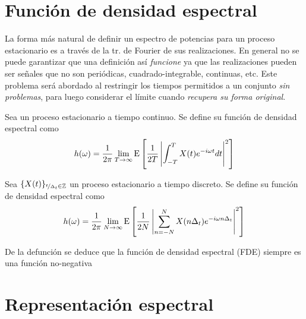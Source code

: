 
\section{Función de densidad espectral}

La forma más natural de definir un espectro de potencias para un proceso estacionario es a través 
de la tr. de Fourier de sus realizaciones. En general no se puede garantizar que una definición así \textit{funcione} ya que las realizaciones pueden ser señales que no son periódicas, 
cuadrado-integrable, continuas, etc.
%
Este problema será abordado al restringir los tiempos permitidos a un conjunto \textit{sin 
problemas}, para luego considerar el límite cuando \textit{recupera su forma original}.

\begin{definicion}
Sea \xt un proceso estacionario a tiempo continuo. Se define su {función de densidad 
espectral} como
\begin{equation}
h(\omega) = \frac{1}{2 \pi} \lim_{T\rightarrow \infty} \mathrm{E}\left[  \frac{1}{2T} 
\left|  \int_{-T}^{T} X(t) e^{-i \omega t} dt \right|^{2}  \right]
\label{txt_FDE_cont}
\end{equation}
\end{definicion}

\begin{definicion}
Sea $\{X(t)\}_{\nicefrac{t}{\Delta_t}\in \mathbb{Z}}$ un proceso estacionario a tiempo discreto. Se 
define su {función de densidad espectral} como
\begin{equation}
h(\omega) = \frac{1}{2 \pi} \lim_{N\rightarrow \infty} \mathrm{E}\left[  \frac{1}{2N} 
\left|  \sum_{n=-N}^{N} X(n \Delta_t) e^{-i \omega n \Delta_t} \right|^{2}  \right]
\label{txt_FDE_disc}
\end{equation}
\end{definicion}

De la defunción se deduce que la función de densidad espectral (FDE) siempre es una función
no-negativa


\section{Representación espectral}

